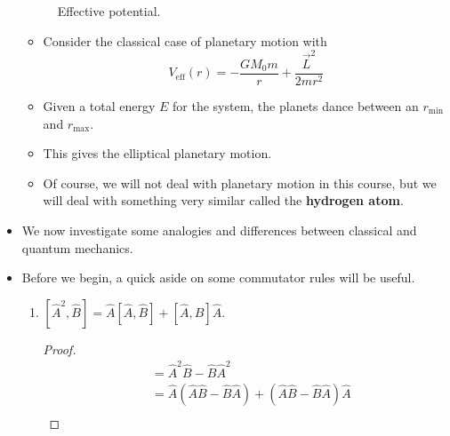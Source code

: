 \documentclass[../notes.tex]{subfiles}
\begin{document}
\begin{itemize}
\begin{figure}[h!]
        \caption{Effective potential.}
        \label{fig:Veff}
    \end{figure}
    \begin{itemize}
        \item Consider the classical case of planetary motion with
        \begin{equation*}
            V_\text{eff}(r) = -\frac{GM_0m}{r}+\frac{\vec{L}^2}{2mr^2}
        \end{equation*}
        \item Given a total energy $E$ for the system, the planets dance between an $r_\text{min}$ and $r_\text{max}$.
        \item This gives the elliptical planetary motion.
        \item Of course, we will not deal with planetary motion in this course, but we will deal with something very similar called the \textbf{hydrogen atom}.
    \end{itemize}
    \item We now investigate some analogies and differences between classical and quantum mechanics.
    \item Before we begin, a quick aside on some commutator rules will be useful.
    \begin{enumerate}
        \item $[\hat{A}^2,\hat{B}]=\hat{A}[\hat{A},\hat{B}]+[\hat{A},\hat{B}]\hat{A}$.
        \begin{proof}
            \vspace{-0.5em}
            \begin{align*}
                [\hat{A}^2,\hat{B}] &= \hat{A}^2\hat{B}-\hat{B}\hat{A}^2\\
                &= \hat{A}(\hat{A}\hat{B}-\hat{B}\hat{A})+(\hat{A}\hat{B}-\hat{B}\hat{A})\hat{A}\\

\end{align*}
\end{proof}
\end{enumerate}
\end{itemize}
\end{document}
